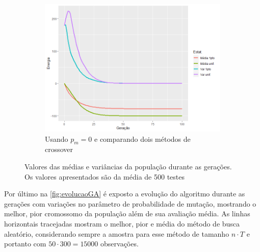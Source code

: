 \begin{figure}[h!]
\begin{subfigure}[b]{0.67\linewidth}
		\includegraphics[width=\linewidth]{imagens/comp_cross_1pto_unif.png}
		\caption{Usando \(p_m = 0\) e comparando dois métodos de crossover}
	\end{subfigure}
\caption{Valores das médias e variâncias da população durante as gerações. Os valores apresentados são da média de 500 testes}
	\label{fig:distribuicao_ising_geracoes}
\end{figure}

Por último na \autoref{fig:evolucaoGA} é exposto a evolução do algoritmo durante as gerações com variações no parâmetro de probabilidade de mutação, mostrando o melhor, pior cromossomo da população além de sua avaliação média. As linhas horizontais tracejadas mostram o melhor, pior e média do método de busca aleatório, considerando sempre a amostra para esse método de tamanho \(n \cdot T\) e portanto com \(50 \cdot 300 = 15000\) observações.

